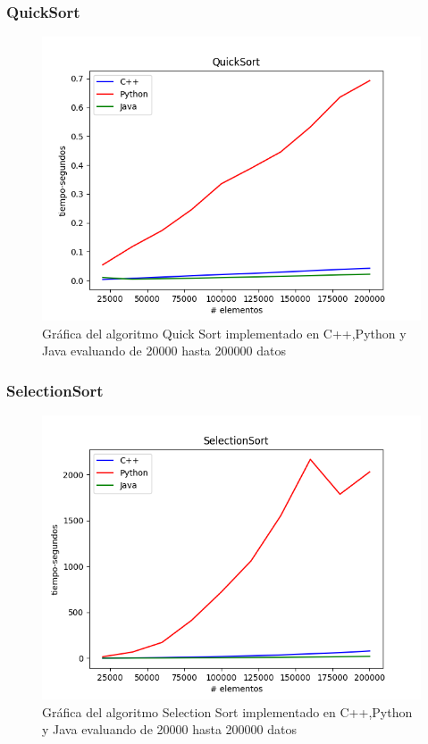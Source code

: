 \subsubsection*{QuickSort}
\begin{figure}[H]
	   \centering
	   \includegraphics[scale=0.5]{Practica01/images/plots/QuickSort.png}
	   \caption{Gráfica del algoritmo Quick Sort implementado en C++,Python y Java evaluando de 20000 hasta 200000 datos}
\end{figure}
\subsubsection*{SelectionSort}
\begin{figure}[H]
	   \centering
	   \includegraphics[scale=0.5]{Practica01/images/plots/SelectionSort.png}
	   \caption{Gráfica del algoritmo Selection Sort implementado en C++,Python y Java evaluando de 20000 hasta 200000 datos}
\end{figure}

